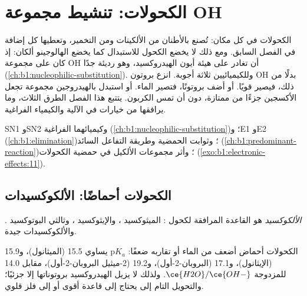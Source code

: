 \chapter{الكحولات: تنشيط مجموعة OH}\label{ch:b1:alcohol-activation}

الكحولات في كل مكان: تُصنع بالأطنان من الألكينات ومن
التخمير، وتعطيها كل إضافة  في الفصل
السابق. ومع ذلك لا يخضع الكحول للاستبدال كما يخضع الهالوجينو ألكان:
إذ كان على مجموعة OH أن تغادر على هيئة أيون الهيدروكسيد، وهو 
 رديئة جدًا (\cref{ch:b1:nucleophilic-substitution}).
وللكيميائيين ثلاثة أجوبة. انزع بروتون OH بدلًا من ذلك، فيصير
  قويًا. أو أضف بروتونًا، فتصير 
الماء. أو استبدل بالهيدروجين مجموعة تجعل
الأكسجين جزءًا من  ممتازة، دون أن تمس
الكربون. يتتبع هذا الفصل الطرق الثلاث، وما يرافقها من خيارات في
الآلية والكيمياء الفراغية.

\begin{recall}
SN1 وSN2 وكيميائهما الفراغية (\cref{ch:b1:nucleophilic-substitution})؛
وE1 وE2  (\cref{ch:b1:elimination})؛ وثوابت الحمضية
وطريقة التفاعل السائد (\cref{ch:b1:predominant-reaction})؛
وأثر مجموعات الألكيل في حمضية الكحولات
(\cref{exo:b1:electronic-effects:11}).
\end{recall}

\section{الكحولات أحماضًا: الألكوكسيدات}

\begin{definition}[الألكوكسيد]\label{def:b1:alcohol-activation:alkoxide}
\emph{الألكوكسيد} هو القاعدة المرافقة  لكحول
: الميثوكسيد ، والإيثوكسيد ،
وثالثي البوتوكسيد . والألكوكسيدات   جيدة.
\end{definition}

\begin{proposition}\label{prop:b1:alcohol-activation:alcohol-acidity}
الكحولات أحماض أضعف من الماء أو تقاربه ضعفًا: $\mathrm{p}K_a$ يساوي
15.5 (الميثانول)، و15.9 (الإيثانول)، و17.1 (البروبان-2-أول)، و19.2
(2-ميثيل البروبان-2-أول)، مقابل 14.0 للمزدوجة $\ce{H2O}/\ce{OH-}$.
ولذلك لا يزيل الهيدروكسيد بروتوناتها إلا جزئيًا؛ والتحويل التام
إلى  يحتاج إلى قاعدة أقوى أو إلى فلز قلوي.
\end{proposition}

